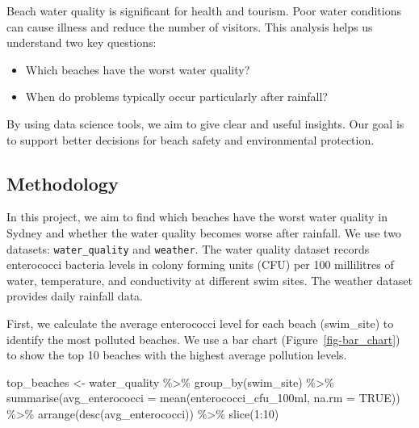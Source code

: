 \documentclass[
  11pt,
]{article}
\newenvironment{Shaded}{\begin{snugshade}}{\end{snugshade}}
\newcommand{\AttributeTok}[1]{\textcolor[rgb]{0.40,0.45,0.13}{#1}}
\newcommand{\ConstantTok}[1]{\textcolor[rgb]{0.56,0.35,0.01}{#1}}
\newcommand{\DecValTok}[1]{\textcolor[rgb]{0.68,0.00,0.00}{#1}}
\newcommand{\FunctionTok}[1]{\textcolor[rgb]{0.28,0.35,0.67}{#1}}
\newcommand{\NormalTok}[1]{\textcolor[rgb]{0.00,0.23,0.31}{#1}}
\newcommand{\OtherTok}[1]{\textcolor[rgb]{0.00,0.23,0.31}{#1}}
\newcommand{\SpecialCharTok}[1]{\textcolor[rgb]{0.37,0.37,0.37}{#1}}
\providecommand{\tightlist}{%
  \setlength{\itemsep}{0pt}\setlength{\parskip}{0pt}}\usepackage{longtable,booktabs,array}
\begin{document}
Beach water quality is significant for health and tourism. Poor water
conditions can cause illness and reduce the number of visitors. This
analysis helps us understand two key questions:

\begin{itemize}
\tightlist
\item
  Which beaches have the worst water quality?
\item
  When do problems typically occur particularly after rainfall?
\end{itemize}

By using data science tools, we aim to give clear and useful insights.
Our goal is to support better decisions for beach safety and
environmental protection.

\subsection{Methodology}\label{methodology}

In this project, we aim to find which beaches have the worst water
quality in Sydney and whether the water quality becomes worse after
rainfall. We use two datasets: \texttt{water\_quality} and
\texttt{weather}. The water quality dataset records enterococci bacteria
levels in colony forming units (CFU) per 100 millilitres of water,
temperature, and conductivity at different swim sites. The weather
dataset provides daily rainfall data.

First, we calculate the average enterococci level for each beach
(swim\_site) to identify the most polluted beaches. We use a bar chart
(Figure~\ref{fig-bar_chart}) to show the top 10 beaches with the highest
average pollution levels.

\begin{Shaded}
\begin{Highlighting}[]
\NormalTok{top\_beaches }\OtherTok{\textless{}{-}}\NormalTok{ water\_quality }\SpecialCharTok{\%\textgreater{}\%}
  \FunctionTok{group\_by}\NormalTok{(swim\_site) }\SpecialCharTok{\%\textgreater{}\%}
  \FunctionTok{summarise}\NormalTok{(}\AttributeTok{avg\_enterococci =} \FunctionTok{mean}\NormalTok{(enterococci\_cfu\_100ml, }\AttributeTok{na.rm =} \ConstantTok{TRUE}\NormalTok{)) }\SpecialCharTok{\%\textgreater{}\%}
  \FunctionTok{arrange}\NormalTok{(}\FunctionTok{desc}\NormalTok{(avg\_enterococci)) }\SpecialCharTok{\%\textgreater{}\%}
  \FunctionTok{slice}\NormalTok{(}\DecValTok{1}\SpecialCharTok{:}\DecValTok{10}\NormalTok{)}
\end{Highlighting}
\end{Shaded}
\end{document}
